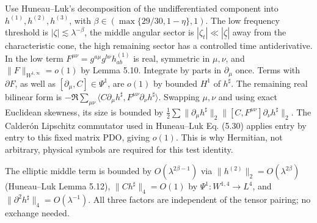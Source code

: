 \documentclass[11pt]{article}
\begin{document}
Use Huneau--Luk's decomposition of the undifferentiated component into \(h^{(1)}, h^{(2)}, h^{(3)}\), with \(\beta\in(\max\{29/30,1-\eta\},1)\). The low frequency threshold is \(|\zeta|\lesssim\lambda^{-\beta}\), the middle angular sector is \(|\zeta_t|\ll|\underline\zeta|\) away from the characteristic cone, the high remaining sector has a controlled time antiderivative. In the low term \(F^{\mu\nu}=g^{a\mu}g^{b\nu}h_{ab}^{(1)}\) is real, symmetric in \(\mu,\nu\), and \(\|F\|_{W^{1,\infty}}=o(1)\) by Lemma 5.10. Integrate by parts in \(\partial_\mu\) once. Terms with \(\partial F\), as well as \([\partial_\mu,C]\in\Psi^1\), are \(o(1)\) by bounded \(H^1\) of \(h^\sharp\). The remaining real bilinear form is \(-\Re\sum_{\mu\nu}\langle C\partial_\mu h^\sharp,F^{\mu\nu}\partial_\nu h^\sharp\rangle\). Swapping \(\mu,\nu\) and using exact Euclidean skewness, its size is bounded by \(\frac12\sum\|\partial_\mu h^\sharp\|_2\|[C,F^{\mu\nu}]\partial_\nu h^\sharp\|_2\). The Calder\'on Lipschitz commutator used in Huneau--Luk Eq. (5.30) applies entry by entry to this fixed matrix PDO, giving \(o(1)\). This is why Hermitian, not arbitrary, physical symbols are required for this test identity.

The elliptic middle term is bounded by \(O(\lambda^{2\beta-1})\) via \(\|h^{(2)}\|_2=O(\lambda^{2\beta})\) (Huneau--Luk Lemma 5.12), \(\|Ch^\sharp\|_4=O(1)\) by \(\Psi^1:W^{1,4}\to L^4\), and \(\|\partial^2 h^\sharp\|_4=O(\lambda^{-1})\). All three factors are independent of the tensor pairing; no exchange needed.
\end{document}
